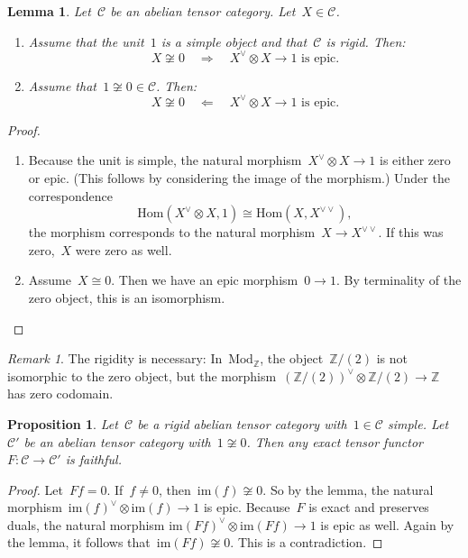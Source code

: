 \documentclass[a4paper,english,12pt]{scrartcl}
\theoremstyle{definition}
\theoremstyle{plain}
\newtheorem{prop}[defn]{Proposition}
\newtheorem{lemma}[defn]{Lemma}
\theoremstyle{remark}
\newtheorem{rem}[defn]{Remark}
\newcommand{\ZZ}{\mathbb{Z}}
\newcommand{\C}{\mathcal{C}}
\renewcommand{\_}{\mathpunct{.}\,}
\newcommand{\?}{\,{:}\,}
\newcommand{\Mod}{\mathrm{Mod}}
\renewcommand{\hom}{\mathrm{Hom}}
\newcommand{\im}{\mathrm{im}}
\begin{document}
\begin{lemma}Let~$\C$ be an abelian tensor category. Let~$X \in \C$.
\begin{enumerate}
\item Assume that the unit~$1$ is a simple object and that~$\C$ is rigid. Then:
\[ X \not\cong 0 \quad\Longrightarrow\quad
  \text{$X^\vee \otimes X \to 1$ is epic.} \]
\item Assume that~$1 \not\cong 0 \in \C$. Then:
\[ X \not\cong 0 \quad\Longleftarrow\quad
  \text{$X^\vee \otimes X \to 1$ is epic.} \]
\end{enumerate}
\end{lemma}
\begin{proof}
\begin{enumerate}
\item Because the unit is simple, the natural morphism~$X^\vee \otimes X \to 1$
is either zero or epic. (This follows by considering the image of the
morphism.) Under the correspondence
\[ \hom(X^\vee \otimes X,1) \cong \hom(X,X^{\vee\vee}), \]
the morphism corresponds to the natural morphism~$X \to X^{\vee\vee}$. If this
was zero,~$X$ were zero as well.
\item Assume~$X \cong 0$. Then we have an epic morphism~$0 \to 1$. By
terminality of the zero object, this is an isomorphism.\qedhere
\end{enumerate}
\end{proof}

\begin{rem}The rigidity is necessary: In~$\Mod_\ZZ$, the object~$\ZZ/(2)$ is
not isomorphic to the zero object, but the morphism~$(\ZZ/(2))^\vee \otimes
\ZZ/(2) \to \ZZ$ has zero codomain.\end{rem}

\begin{prop}Let~$\C$ be a rigid abelian tensor category with~$1 \in \C$ simple.
Let~$\C'$ be an abelian tensor category with~$1 \not\cong 0$. Then any exact
tensor functor~$F : \C \to \C'$ is faithful.\end{prop}
\begin{proof}Let~$Ff = 0$. If~$f \neq 0$, then~$\im(f) \not\cong 0$. So by the
lemma, the natural morphism~$\im(f)^\vee \otimes \im(f) \to 1$ is epic.
Because~$F$ is exact and preserves duals, the natural morphism
$\im(Ff)^\vee \otimes \im(Ff) \to 1$ is epic as well. Again by the lemma, it
follows that~$\im(Ff) \not\cong 0$. This is a contradiction.\end{proof}
\end{document}
